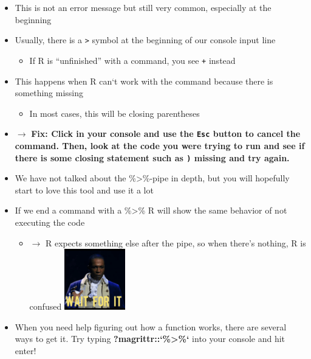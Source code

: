 \documentclass[
]{book}
\providecommand{\tightlist}{%
  \setlength{\itemsep}{0pt}\setlength{\parskip}{0pt}}
\begin{document}
\begin{itemize}
\item
  This is not an error message but still very common, especially at the beginning
\item
  Usually, there is a \texttt{\textgreater{}} symbol at the beginning of our console input line

  \begin{itemize}
  \tightlist
  \item
    If R is ``unfinished'' with a command, you see \texttt{+} instead
  \end{itemize}
\item
  This happens when R can`t work with the command because there is something missing

  \begin{itemize}
  \tightlist
  \item
    In most cases, this will be closing parentheses
  \end{itemize}
\item
  \(\rightarrow\) \textbf{Fix: Click in your console and use the \texttt{Esc} button to cancel the command. Then, look at the code you were trying to run and see if there is some closing statement such as \texttt{)} missing and try again.}
\item
  We have not talked about the \%\textgreater\%-pipe in depth, but you will hopefully start to love this tool and use it a lot
\item
  If we end a command with a \%\textgreater\% R will show the same behavior of not executing the code

  \begin{itemize}
  \tightlist
  \item
    \(\rightarrow\) R expects something else after the pipe, so when there's nothing, R is confused \includegraphics[width=\textwidth,height=1.04167in]{./img/waitforit.gif}
  \end{itemize}
\item
  When you need help figuring out how a function works, there are several ways to get it. Try typing \textbf{?magrittr::`\%\textgreater\%`} into your console and hit enter!
\end{itemize}
\end{document}

